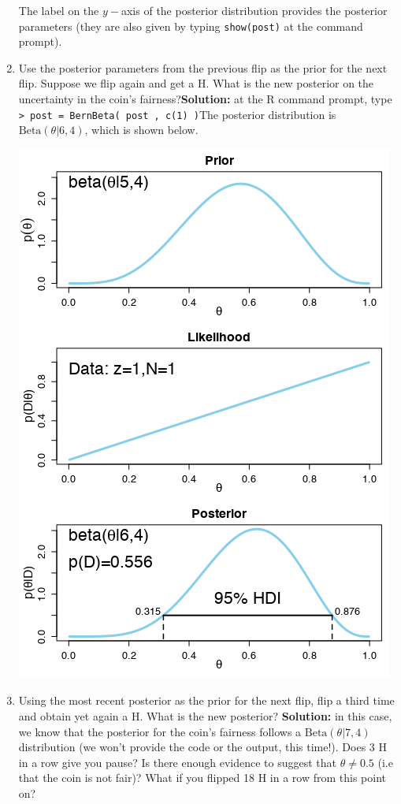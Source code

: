 \begin{Example}
\begin{enumerate}[label=(\alph*)]
\begin{center}
	\end{center}
	The label on the $y-$axis of the posterior distribution provides the posterior parameters (they are also given by typing \small \texttt{show(post)} \normalsize at the command prompt).
	
\item Use the posterior parameters from the previous flip as the prior for the next flip. Suppose we flip again and get a H. What is the new posterior on the uncertainty in the coin's fairness?\newl \textbf{Solution:} at the R command prompt, type
\newl \small \texttt{> post = BernBeta( post , c(1) )}\normalsize\newl The posterior distribution is $\text{Beta}(\theta |6,4)$, which is shown below. 
\begin{center}
	\includegraphics[width=\linewidth]{Images/example51b.png}
	\end{center} 
\item Using the most recent posterior as the prior for the next flip, flip a third time and obtain yet again a H. What is the new posterior? \newl \textbf{Solution:} in this case, we know that the posterior for the coin's fairness follows a  $\text{Beta}(\theta |7,4)$ distribution (we won't provide the code or the output, this time!). Does 3 H in a row give you pause? Is there enough evidence to suggest that $\theta\neq 0.5$ (i.e that the coin is not fair)? What if you flipped 18 H in a row from this point on? 
\end{enumerate}
\end{Example} 
